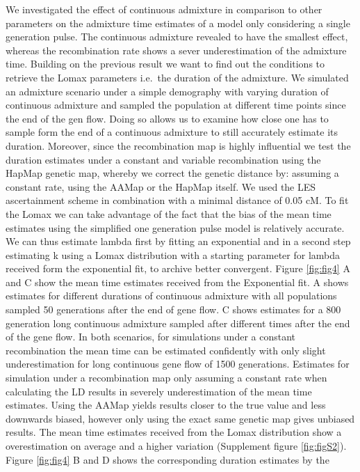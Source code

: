 \documentclass[]{article}
\begin{document}
We investigated the effect of continuous admixture in comparison to
other parameters on the admixture time estimates of a model only
considering a single generation pulse. The continuous admixture revealed
to have the smallest effect, whereas the recombination rate shows a
sever underestimation of the admixture time. Building on the previous
result we want to find out the conditions to retrieve the Lomax
parameters i.e.~the duration of the admixture. We simulated an admixture
scenario under a simple demography with varying duration of continuous
admixture and sampled the population at different time points since the
end of the gen flow. Doing so allows us to examine how close one has to
sample form the end of a continuous admixture to still accurately
estimate its duration. Moreover, since the recombination map is highly
influential we test the duration estimates under a constant and variable
recombination using the HapMap genetic map, whereby we correct the
genetic distance by: assuming a constant rate, using the AAMap or the
HapMap itself. We used the LES ascertainment scheme in combination with
a minimal distance of 0.05 cM. To fit the Lomax we can take advantage of
the fact that the bias of the mean time estimates using the simplified
one generation pulse model is relatively accurate. We can thus estimate
lambda first by fitting an exponential and in a second step estimating k
using a Lomax distribution with a starting parameter for lambda received
form the exponential fit, to archive better convergent. Figure \ref{fig:fig4} A and C show the mean
time estimates received from the Exponential fit. A shows estimates for
different durations of continuous admixture with all populations sampled
50 generations after the end of gene flow. C shows estimates for a 800
generation long continuous admixture sampled after different times after
the end of the gene flow. In both scenarios, for simulations under a
constant recombination the mean time can be estimated confidently with
only slight underestimation for long continuous gene flow of 1500
generations. Estimates for simulation under a recombination map only
assuming a constant rate when calculating the LD results in severely
underestimation of the mean time estimates. Using the AAMap yields
results closer to the true value and less downwards biased, however only
using the exact same genetic map gives unbiased results. The mean time estimates received from the Lomax distribution show a overestimation on average and a higher variation (Supplement figure \ref{fig:figS2}).  Figure
\ref{fig:fig4} B and D shows the corresponding duration estimates by the
\end{document}
